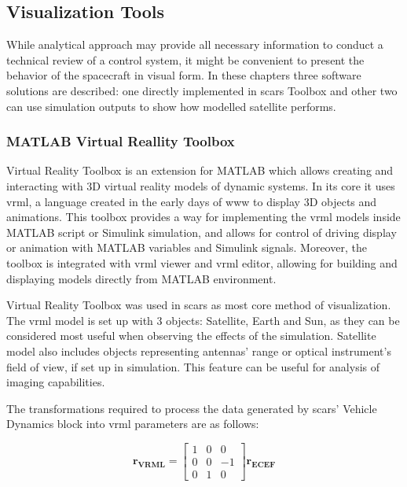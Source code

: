 \subsection{Visualization Tools}\label{sec:visualization}
    While analytical approach may provide all necessary information to conduct a technical review of a control system, it might be convenient to present the behavior of the spacecraft in visual form. In these chapters three software solutions are described: one directly implemented in \ac{scars} Toolbox and other two can use simulation outputs to show how modelled satellite performs.
    
    \subsubsection{MATLAB Virtual Reallity Toolbox}
        Virtual Reality Toolbox is an extension for MATLAB which allows creating and interacting with 3D virtual reality models of dynamic systems. In its core it uses \ac{vrml}, a language created in the early days of \ac{www} to display 3D objects and animations. This toolbox provides a way for implementing the \ac{vrml} models inside MATLAB script or Simulink simulation, and allows for control of driving display or animation with MATLAB variables and Simulink signals. Moreover, the toolbox is integrated with \ac{vrml} viewer and \ac{vrml} editor, allowing for building and displaying models directly from MATLAB environment.

        Virtual Reality Toolbox was used in \ac{scars} as most core method of visualization. The \ac{vrml} model is set up with 3 objects: Satellite, Earth and Sun, as they can be considered most useful when observing the effects of the simulation. Satellite model also includes objects representing antennas' range or optical instrument's field of view, if set up in simulation. This feature can be useful for analysis of imaging capabilities.

        The transformations required to process the data generated by \ac{scars}' Vehicle Dynamics block into \ac{vrml} parameters are as follows:
        
        \begin{equation}
            \mathbf{r_{VRML}}=
            \begin{bmatrix}
            1&0&0\\ 
            0&0&-1\\ 
            0&1&0
            \end{bmatrix}
            \mathbf{r_{ECEF}}
        \end{equation}
        
